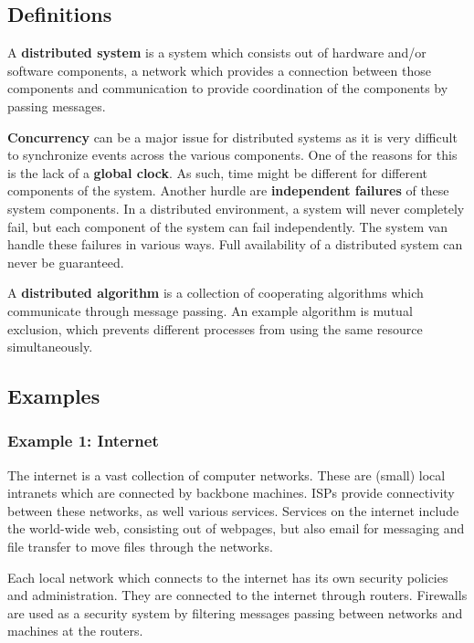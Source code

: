 \documentclass[a4paper]{article}
\begin{document}
\subsection{Definitions}

A \textbf{distributed system} is a system which consists out of hardware and/or software components, a network which provides a connection between those components and communication to provide coordination of the components by passing messages.

\textbf{Concurrency} can be a major issue for distributed systems as it is very difficult to synchronize events across the various components. One of the reasons for this is the lack of a \textbf{global clock}. As such, time might be different for different components of the system. Another hurdle are \textbf{independent failures} of these system components. In a distributed environment, a system will never completely fail, but each component of the system can fail independently. The system van handle these failures in various ways. Full availability of a distributed system can never be guaranteed.

A \textbf{distributed algorithm} is a collection of cooperating algorithms which communicate through message passing. An example algorithm is mutual exclusion, which prevents different processes from using the same resource simultaneously.

\subsection{Examples}

\subsubsection{Example 1: Internet}

The internet is a vast collection of computer networks. These are (small) local intranets which are connected by backbone machines. ISPs provide connectivity between these networks, as well various services. Services on the internet include the world-wide web, consisting out of webpages, but also email for messaging and file transfer to move files through the networks.

Each local network which connects to the internet has its own security policies and administration. They are connected to the internet through routers. Firewalls are used as a security system by filtering messages passing between networks and machines at the routers.
\end{document}

